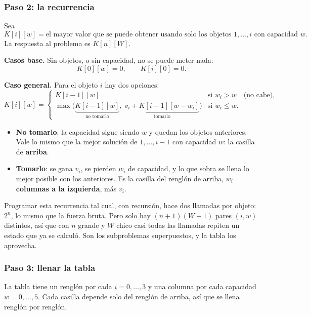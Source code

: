 \documentclass[11pt,letterpaper]{article}
\begin{document}
\subsubsection*{Paso 2: la recurrencia}

Sea
\[
  K[i][w] = \text{el mayor valor que se puede obtener usando solo los
  objetos } 1, \ldots, i \text{ con capacidad } w .
\]
La respuesta al problema es $K[n][W]$.

\textbf{Casos base.} Sin objetos, o sin capacidad, no se puede meter
nada:
\[
  K[0][w] = 0 , \qquad K[i][0] = 0 .
\]

\textbf{Caso general.} Para el objeto $i$ hay dos opciones:
\[
  K[i][w] =
  \begin{cases}
    K[i-1][w]
      & \text{si } w_i > w \quad \text{(no cabe)} , \\[4pt]
    \max\Big( \underbrace{K[i-1][w]}_{\text{no tomarlo}} ,\;
              \underbrace{v_i + K[i-1][w - w_i]}_{\text{tomarlo}}
        \Big)
      & \text{si } w_i \leq w .
  \end{cases}
\]

\begin{itemize}[itemsep=0.3em]
  \item \textbf{No tomarlo}: la capacidad sigue siendo $w$ y quedan
        los objetos anteriores. Vale lo mismo que la mejor solución de
        $1, \ldots, i-1$ con capacidad $w$: la casilla de
        \textbf{arriba}.
  \item \textbf{Tomarlo}: se gana $v_i$, se pierden $w_i$ de
        capacidad, y lo que sobra se llena lo mejor posible con los
        anteriores. Es la casilla del renglón de arriba, $w_i$
        \textbf{columnas a la izquierda}, más $v_i$.
\end{itemize}

\begin{ojo}
  Programar esta recurrencia tal cual, con recursión, hace dos
  llamadas por objeto: $2^{n}$, lo mismo que la fuerza bruta. Pero
  solo hay $(n + 1)(W + 1)$ pares $(i, w)$ distintos, así que con
  $n$ grande y $W$ chico casi todas las llamadas repiten un estado que
  ya se calculó. Son los subproblemas superpuestos, y la tabla los
  aprovecha.
\end{ojo}

\subsubsection*{Paso 3: llenar la tabla}

La tabla tiene un renglón por cada $i = 0, \ldots, 3$ y una columna por
cada capacidad $w = 0, \ldots, 5$. Cada casilla depende solo del
renglón de arriba, así que se llena renglón por renglón.
\end{document}
